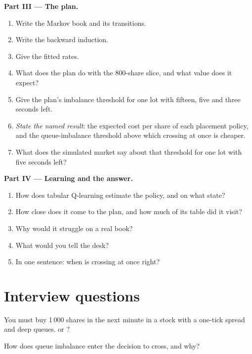\begin{problem}
\medskip\noindent\textbf{Part III --- The plan.}
\begin{enumerate}[resume]
\item Write the Markov book and its transitions.
\item Write the backward induction.
\item Give the fitted rates.
\item What does the plan do with the 800-share slice, and what value does it expect?
\item Give the plan's imbalance threshold for one lot with fifteen, five and three seconds left.
\item \emph{State the named result}: the expected cost per share of each placement policy, and the queue-imbalance threshold above which crossing
at once is cheaper.
\item What does the simulated market say about that threshold for one lot with five seconds left?
\end{enumerate}

\medskip\noindent\textbf{Part IV --- Learning and the answer.}
\begin{enumerate}[resume]
\item How does tabular Q-learning estimate the policy, and on what state?
\item How close does it come to the plan, and how much of its table did it visit?
\item Why would it struggle on a real book?
\item What would you tell the desk?
\item In one sentence: when is crossing at once right?
\end{enumerate}
\end{problem}

\section{Interview questions}

\begin{interviewq}\label{iq:mx:child-order-placement:1}
You must buy 1\,000 shares in the next minute in a stock with a one-tick spread and deep queues.  or ?
\end{interviewq}

\begin{interviewq}\label{iq:mx:child-order-placement:2}
How does queue imbalance enter the decision to cross, and why?
\end{interviewq}

